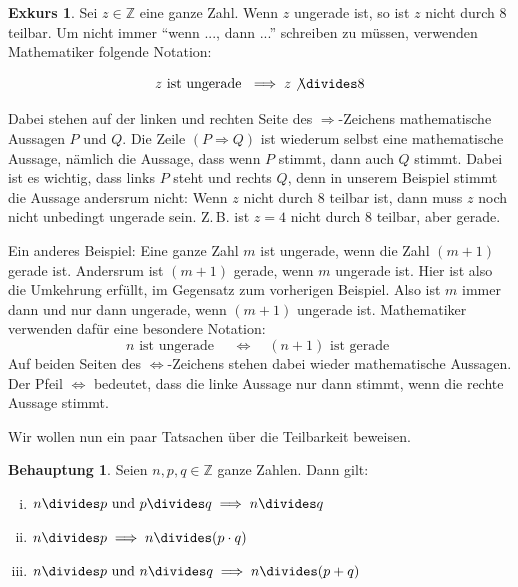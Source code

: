 \documentclass[a4paper,ngerman,12pt]{scrartcl}
\newcommand{\Z}{\mathbb{Z}}
\theoremstyle{definition}
\newtheorem{satz}{Behauptung}
\newtheorem*{exk}{Exkurs}
\newenvironment{exkurs}{\begin{shaded}\begin{exk}}{\end{exk}\end{shaded}}
\newenvironment{satzliste}{\begin{enumerate}[(i)]}{\end{enumerate}}
\begin{document}
\begin{exkurs}
  Sei $z \in \Z$ eine ganze Zahl. Wenn $z$ ungerade ist, so ist $z$ nicht durch $8$ teilbar. Um nicht immer "`wenn ..., dann ..."' schreiben zu müssen, verwenden Mathematiker folgende Notation:

  \[ z \text{ ist ungerade } \implies z \not\divides 8 \]

  Dabei stehen auf der linken und rechten Seite des $\Rightarrow$-Zeichens mathematische Aussagen $P$ und $Q$. Die Zeile $(P \Rightarrow Q)$ ist wiederum selbst eine mathematische Aussage, nämlich die Aussage, dass wenn $P$ stimmt, dann auch $Q$ stimmt. Dabei ist es wichtig, dass links $P$ steht und rechts $Q$, denn in unserem Beispiel stimmt die Aussage andersrum nicht: Wenn $z$ nicht durch $8$ teilbar ist, dann muss $z$ noch nicht unbedingt ungerade sein. Z.\,B. ist $z = 4$ nicht durch $8$ teilbar, aber gerade.

  Ein anderes Beispiel: Eine ganze Zahl $m$ ist ungerade, wenn die Zahl $(m+1)$ gerade ist. Andersrum ist $(m+1)$ gerade, wenn $m$ ungerade ist. Hier ist also die Umkehrung erfüllt, im Gegensatz zum vorherigen Beispiel. Also ist $m$ immer dann und nur dann ungerade, wenn $(m+1)$ ungerade ist. Mathematiker verwenden dafür eine besondere Notation:
  \[ n \text{ ist ungerade } \quad \iff \quad (n + 1) \text{ ist gerade } \]
  Auf beiden Seiten des $\Leftrightarrow$-Zeichens stehen dabei wieder mathematische Aussagen. Der Pfeil $\Leftrightarrow$ bedeutet, dass die linke Aussage nur dann stimmt, wenn die rechte Aussage stimmt.
\end{exkurs}

Wir wollen nun ein paar Tatsachen über die Teilbarkeit beweisen.

\begin{satz}
  Seien $n, p, q \in \Z$ ganze Zahlen. Dann gilt:
  \begin{satzliste}
    \item $n \divides p \text{ und } p \divides q \implies n \divides q$
    \item $n \divides p \implies n \divides (p \cdot q)$
    \item $n \divides p \text{ und } n \divides q \implies n \divides (p + q)$
  \end{satzliste}
\end{satz}
\end{document}
